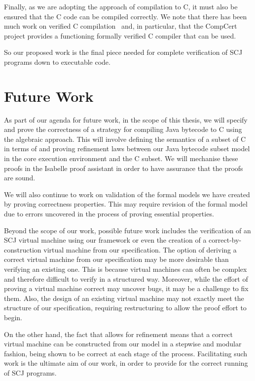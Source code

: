 \documentclass[a4paper,10pt]{report}
\begin{document}
Finally, as we are adopting the approach of compilation to C, it must
also be ensured that the C code can be compiled correctly.
We note that there has been much work on verified C
compilation~\cite{leroy2009a, leroy2009b, leroy2012, leinenbach2005,
  blazy2006} and, in particular, that the CompCert project provides a
functioning formally verified C compiler that can be used.

So our proposed work is the final piece needed for complete
verification of SCJ programs down to executable code.

\section{Future Work}
\label{future-work-section}

As part of our agenda for future work, in the scope of this thesis, we
will specify and prove the correctness of a strategy for compiling
Java bytecode to C using the algebraic approach.
This will involve defining the semantics of a subset of C in terms of
\Circus{} and proving refinement laws between our Java bytecode subset
model in the core execution environment and the C subset.
We will mechanise these proofs in the Isabelle proof assistant in
order to have assurance that the proofs are sound.

We will also continue to work on validation of the formal models we
have created by proving correctness properties.
This may require revision of the formal model due to errors uncovered
in the process of proving essential properties.

Beyond the scope of our work, possible future work includes the
verification of an SCJ virtual machine using our framework or even the
creation of a correct-by-construction virtual machine from our
specification.
The option of deriving a correct virtual machine from our
specification may be more desirable than verifying an existing one.
This is because virtual machines can often be complex and therefore
difficult to verify in a structured way.
Moreover, while the effort of proving a virtual machine correct may
uncover bugs, it may be a challenge to fix them.
Also, the design of an existing virtual machine may not exactly meet
the structure of our specification, requiring restructuring to allow
the proof effort to begin.

On the other hand, the fact that \Circus{} allows for refinement means
that a correct virtual machine can be constructed from our model in a
stepwise and modular fashion, being shown to be correct at each stage
of the process.
Facilitating such work is the ultimate aim of our work, in order to
provide for the correct running of SCJ programs.
\end{document}
